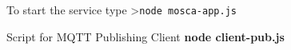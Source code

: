 \documentclass[16pt]{article}
\begin{document}




To start the service type \textgreater{}\texttt{node mosca-app.js}

Script for MQTT Publishing Client \textbf{node client-pub.js}

 
\end{document}
